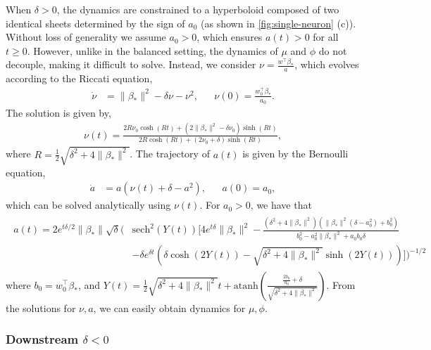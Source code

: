 \documentclass{article}
\theoremstyle{plain}
\theoremstyle{definition}
\theoremstyle{remark}
\begin{document}
When $\delta > 0$, the dynamics are constrained to a hyperboloid composed of two identical sheets determined by the sign of $a_0$ (as shown in \cref{fig:single-neuron} (c)).
%
%
Without loss of generality we assume $a_0 > 0$, which ensures $a(t) > 0$ for all $t \ge 0$.
%
However, unlike in the balanced setting, the dynamics of $\mu$ and $\phi$ do not decouple, making it difficult to solve.
%
Instead, we consider $\nu = \tfrac{w^\intercal \beta_*}{a}$, which evolves according to the Riccati equation,
\begin{align}
    \dot{\nu} 
    &= \|\beta_*\|^2 - \delta\nu - \nu^2, &&\nu(0)=\tfrac{w_0^\intercal \beta_*}{a_0}.
\end{align}
The solution is given by,
\begin{align} \label{eq:nu}
    \nu(t) = \frac{2R\nu_0 \cosh \left(R t\right)+\left(2\|\beta_*\|^2 - \delta\nu_0\right) \sinh \left(Rt\right)}{2R \cosh \left(R t\right) + (2 \nu_0+\delta) \sinh \left(Rt \right)},
\end{align}
where $R = \frac{1}{2}\sqrt{\delta^2+4 \|\beta_*\|^2}$.
%
The trajectory of $a(t)$ is given by the Bernoulli equation,
\begin{align} \label{eq:a-dot-with-nu}
    \dot{a} &= a(\nu(t) + \delta - a^2), && a(0)=a_0,
\end{align}
which can be solved analytically using $\nu(t)$.
%
For $a_0 > 0$, we have that
\begin{align*}
\begin{split}
    a(t) = 2e^{t\delta/2}\|\beta_*\|\sqrt{\delta} \Bigg(& \mathrm{sech}^2\left(Y(t)\right) \bigg[ 4e^{t\delta}\|\beta_*\|^2 
    -\frac{\left(\delta ^2+4 \|\beta_*\|^2\right) \left(\|\beta_*\|^2 \left(\delta -a_0^2\right) + b_0^2\right)}{b_0^2 - a_0^2\|\beta_*\|^2 + a_0b_0\delta} \\
    & - \delta  e^{\delta  t}
     \left( \delta  \cosh \left(2Y(t)\right)-\sqrt{\delta ^2+4 \|\beta_*\|^2} \sinh \left(2Y(t)\right)\right)\bigg] \Bigg)^{-1/2}
\end{split}
\end{align*}
where $b_0 = w_0^\intercal \beta_*$, and $Y(t) = \frac{1}{2}\sqrt{\delta^2 + 4\|\beta_*\|^2}t + \mathrm{atanh}\left(\frac{\frac{2b_0}{a_0} + \delta}{\sqrt{\delta^2 + 4\|\beta_*\|^2}}\right)$.
%
From the solutions for $\nu, a$, we can easily obtain dynamics for $\mu, \phi$.


\subsubsection{Downstream \texorpdfstring{$\delta < 0$}{}} 
\label{app:single-neuron-negative}
\end{document}

